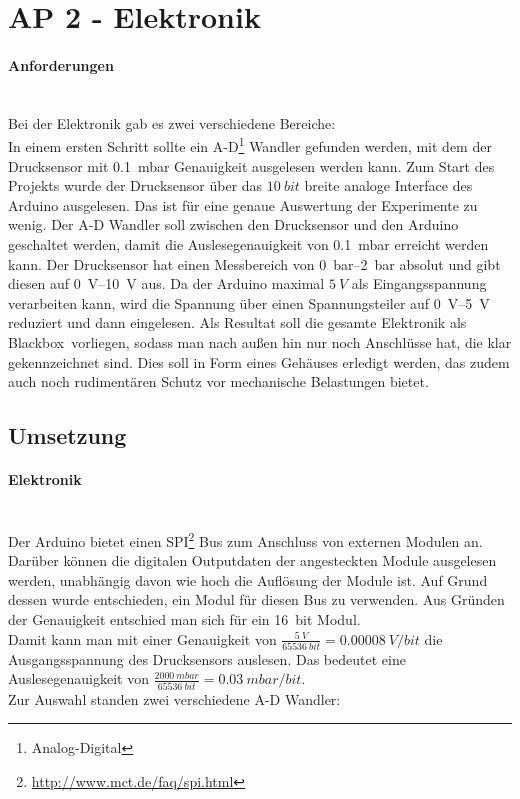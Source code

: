 \newpage

\section{AP 2 - Elektronik}

\paragraph{Anforderungen}
\hfill \\
Bei der Elektronik gab es zwei verschiedene Bereiche: \\
In einem ersten Schritt sollte ein A-D\footnote{Analog-Digital} Wandler gefunden werden, mit dem der Drucksensor mit \SI{0,1}{mbar} Genauigkeit ausgelesen werden kann. Zum Start des Projekts wurde der Drucksensor über das $\SI{10}{bit}$ breite analoge Interface des Arduino ausgelesen. Das ist für eine genaue Auswertung der Experimente zu wenig. Der A-D Wandler soll zwischen den Drucksensor und den Arduino geschaltet werden, damit die Auslesegenauigkeit von \SI{0,1}{mbar} erreicht werden kann. Der Drucksensor hat einen Messbereich von \SIrange{0}{2}{\bar} absolut und gibt diesen auf \SIrange{0}{10}{\volt} aus. Da der Arduino maximal $\SI{5}{V}$ als Eingangsspannung verarbeiten kann, wird die Spannung über einen Spannungsteiler auf \SIrange{0}{5}{\volt} reduziert und dann eingelesen. 
Als Resultat soll die gesamte Elektronik als \glqq Blackbox\grqq \ vorliegen, sodass man nach außen hin nur noch Anschlüsse hat, die klar gekennzeichnet sind. Dies soll in Form eines Gehäuses erledigt werden, das zudem auch noch rudimentären Schutz vor mechanische Belastungen bietet.


\subsection{Umsetzung}


\paragraph{Elektronik}
\hfill \\
Der Arduino bietet einen SPI\footnote{\url{http://www.mct.de/faq/spi.html}} Bus zum Anschluss von externen Modulen an. Darüber können die digitalen Outputdaten der angesteckten Module ausgelesen werden, unabhängig davon wie hoch die Auflösung der Module ist. Auf Grund dessen wurde entschieden, ein Modul für diesen Bus zu verwenden. Aus Gründen der Genauigkeit entschied man sich für ein \SI{16}{bit} Modul. \\
Damit kann man mit einer Genauigkeit von $\frac{\SI{5}{V}}{\SI{65536}{bit}} = \SI{0,00008}{V/bit}$ die Ausgangsspannung des Drucksensors auslesen. Das bedeutet eine Auslesegenauigkeit von $\frac{\SI{2000}{mbar}}{\SI{65536}{bit}} = \SI{0,03}{mbar/bit}$. \\
Zur Auswahl standen zwei verschiedene A-D Wandler:

